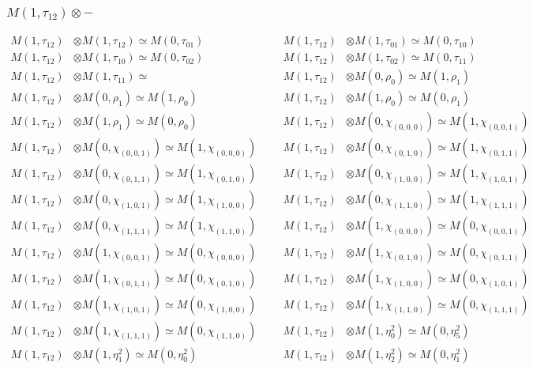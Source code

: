 \subsubsection{$ M(1,\tau_{12})\otimes -$}
\begin{align*}
M(1,\tau_{12}) &\otimes M(1,\tau_{12}) \simeq M(0,\tau_{01}) &&& M(1,\tau_{12}) &\otimes M(1,\tau_{01}) \simeq M(0,\tau_{10})\\
M(1,\tau_{12}) &\otimes M(1,\tau_{10}) \simeq M(0,\tau_{02}) &&& M(1,\tau_{12}) &\otimes M(1,\tau_{02}) \simeq M(0,\tau_{11})\\
M(1,\tau_{12}) &\otimes M(1,\tau_{11}) \simeq  &&& M(1,\tau_{12}) &\otimes M(0,\rho_{0}) \simeq M(1,\rho_{1})\\
M(1,\tau_{12}) &\otimes M(0,\rho_{1}) \simeq M(1,\rho_{0}) &&& M(1,\tau_{12}) &\otimes M(1,\rho_{0}) \simeq M(0,\rho_{1})\\
M(1,\tau_{12}) &\otimes M(1,\rho_{1}) \simeq M(0,\rho_{0}) &&& M(1,\tau_{12}) &\otimes M(0,\chi_{(0,0,0)}) \simeq M(1,\chi_{(0,0,1)})\\
M(1,\tau_{12}) &\otimes M(0,\chi_{(0,0,1)}) \simeq M(1,\chi_{(0,0,0)}) &&& M(1,\tau_{12}) &\otimes M(0,\chi_{(0,1,0)}) \simeq M(1,\chi_{(0,1,1)})\\
M(1,\tau_{12}) &\otimes M(0,\chi_{(0,1,1)}) \simeq M(1,\chi_{(0,1,0)}) &&& M(1,\tau_{12}) &\otimes M(0,\chi_{(1,0,0)}) \simeq M(1,\chi_{(1,0,1)})\\
M(1,\tau_{12}) &\otimes M(0,\chi_{(1,0,1)}) \simeq M(1,\chi_{(1,0,0)}) &&& M(1,\tau_{12}) &\otimes M(0,\chi_{(1,1,0)}) \simeq M(1,\chi_{(1,1,1)})\\
M(1,\tau_{12}) &\otimes M(0,\chi_{(1,1,1)}) \simeq M(1,\chi_{(1,1,0)}) &&& M(1,\tau_{12}) &\otimes M(1,\chi_{(0,0,0)}) \simeq M(0,\chi_{(0,0,1)})\\
M(1,\tau_{12}) &\otimes M(1,\chi_{(0,0,1)}) \simeq M(0,\chi_{(0,0,0)}) &&& M(1,\tau_{12}) &\otimes M(1,\chi_{(0,1,0)}) \simeq M(0,\chi_{(0,1,1)})\\
M(1,\tau_{12}) &\otimes M(1,\chi_{(0,1,1)}) \simeq M(0,\chi_{(0,1,0)}) &&& M(1,\tau_{12}) &\otimes M(1,\chi_{(1,0,0)}) \simeq M(0,\chi_{(1,0,1)})\\
M(1,\tau_{12}) &\otimes M(1,\chi_{(1,0,1)}) \simeq M(0,\chi_{(1,0,0)}) &&& M(1,\tau_{12}) &\otimes M(1,\chi_{(1,1,0)}) \simeq M(0,\chi_{(1,1,1)})\\
M(1,\tau_{12}) &\otimes M(1,\chi_{(1,1,1)}) \simeq M(0,\chi_{(1,1,0)}) &&& M(1,\tau_{12}) &\otimes M(1,\eta^{2}_{0}) \simeq M(0,\eta^{2}_{5})\\
M(1,\tau_{12}) &\otimes M(1,\eta^{2}_{1}) \simeq M(0,\eta^{2}_{0}) &&& M(1,\tau_{12}) &\otimes M(1,\eta^{2}_{2}) \simeq M(0,\eta^{2}_{1})\\

\end{align*}
